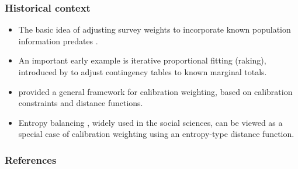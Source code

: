 \documentclass{my_eth_beamer}
\numberwithin{equation}{section}
\begin{document}
\begin{frame}
    \frametitle{Historical context}
    \begin{itemize}
    \setlength{\itemsep}{10pt}
        \item The basic idea of adjusting survey weights to incorporate known
            population information predates \citet{deville_sarndal_1992}.
        \item An important early example is \alert{iterative proportional
            fitting} (raking), introduced by \citet{deming_stephan_1940} to
            adjust contingency tables to known marginal totals.
        \item \citet{deville_sarndal_1992} provided a general framework for
            \alert{calibration weighting}, based on calibration constraints
            and distance functions.
        \item \alert{Entropy balancing} \citep{hainmueller_2012}, widely used
            in the social sciences, can be viewed as a special case of
            calibration weighting using an entropy-type distance function.
    \end{itemize}
\end{frame}

\setcounter{section}{\the\numexpr\value{section}-1\relax}
\begin{frame}
    \frametitle{References}
    {\footnotesize
        
        
    }
\end{frame}

\lastpage
\end{document}
